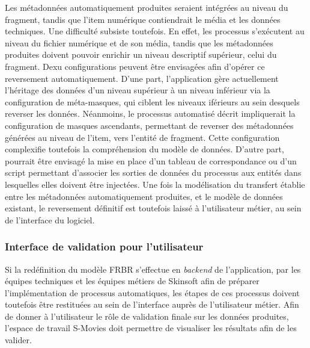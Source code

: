 Les métadonnées automatiquement produites seraient intégrées au niveau du fragment, tandis que l'item numérique contiendrait le média et les données techniques. 
Une difficulté subsiste toutefois. En effet, les processus s'exécutent au niveau du fichier numérique et de son média, tandis que les métadonnées produites doivent pouvoir enrichir un niveau descriptif supérieur, celui du fragment. Dexu configurations peuvent être envisagées afin d'opérer ce reversement automatiquement. D'une part, l'application gère actuellement l'héritage des données d'un niveau supérieur à un niveau inférieur via la configuration de méta-masques, qui ciblent les niveaux iférieurs au sein desquels reverser les données. Néanmoins, le processus automatisé décrit impliquerait la configuration de masques ascendants, permettant de reverser des métadonnées générées au niveau de l'item, vers l'entité de fragment. Cette configuration complexifie toutefois la compréhension du modèle de données.
D'autre part, pourrait être envisagé la mise en place d'un tableau de correspondance ou d'un script permettant d'associer les sorties de données du processus aux entités dans lesquelles elles doivent être injectées. 
Une fois la modélisation du transfert établie entre les métadonnées automatiquement produites, et le modèle de données existant, le reversement définitif est toutefois laissé à l'utilisateur métier, au sein de l'interface du logiciel. 

\subsubsection{Interface de validation pour l'utilisateur} 

Si la redéfinition du modèle FRBR s'effectue en \textit{backend} de l’application, par les équipes techniques et les équipes métiers de Skinsoft afin de préparer l’implémentation de processus automatiques, les étapes de ces processus doivent toutefois être restituées au sein de l'interface auprès de l'utilisateur métier. Afin de donner à l'utilisateur le rôle de validation finale sur les données produites, l'espace de travail S-Movies doit permettre de visualiser les résultats afin de les valider. 

